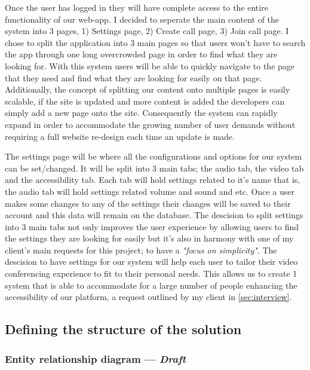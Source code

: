 Once the user has logged in they will have complete access to 
the entire functionality of our web-app. I decided to seperate
the main content of the system into 3 pages, 1) Settings page,
2) Create call page, 3) Join call page. I chose to split the 
application into 3 main pages so that users won't have to 
search the app through one long overcrowded page in order to 
find what they are looking for. With this system users will be
able to quickly navigate to the page that they need and find 
what they are looking for easily on that page. Additionally, 
the concept of splitting our content onto multiple pages is 
easily scalable, if the site is updated and more content is 
added the developers can simply add a new page onto the site.
Consequently the system can rapidly expand in order to 
accommodate the growing number of user demands without
requiring a full website re-design each time an update is 
made. \\ \vspace{0.2cm}

The settings page will be where all the configurations and 
options for our system can be set/changed. It will be split
into 3 main tabs; the audio tab, the video tab and the 
accessibility tab. Each tab will hold settings related to it's
name that is, the audio tab will hold settings related volume
and sound and etc. Once a user makes some changes to any of the
settings their changes will be saved to their account and this 
data will remain on the database. The descision to split 
settings into 3 main tabs not only improves the user experience
by allowing users to find the settings they are looking for
easily but it's also in harmony with one of my client's main 
requests for this project; to have a \textit{"focus on 
simplicity"}. The descision to have settings for our system
will help each user to tailor their video conferencing
experience to fit to their personal needs. This allows us to 
create 1 system that is able to accommodate for a large 
number of people enhancing the accessibility of our platform, 
a request outlined by my client in \ref{sec:interview}. 

\subsection{Defining the structure of the solution}

\subsubsection{Entity relationship diagram — \textit{Draft}}


